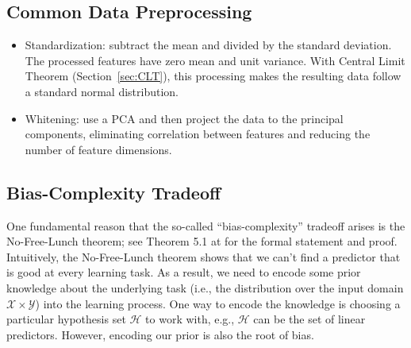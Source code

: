 \subsection{Common Data Preprocessing}
    \begin{itemize}
        \item Standardization: subtract the mean and divided by the standard deviation. The processed features have zero mean and unit variance. With Central Limit Theorem (Section~\ref{sec:CLT}), this processing makes the resulting data follow a standard normal distribution.
        \item Whitening: use a PCA and then project the data to the principal components, eliminating correlation between features and reducing the number of feature dimensions. 
    \end{itemize}
    


\subsection{Bias-Complexity Tradeoff}
One fundamental reason that the so-called ``bias-complexity'' tradeoff arises is the No-Free-Lunch theorem; see Theorem 5.1 at \cite{shalev2014understanding} for the formal statement and proof.
Intuitively, the No-Free-Lunch theorem shows that we can't find a predictor that is good at every learning task. 
As a result, we need to encode some prior knowledge about the underlying task (i.e., the distribution over the input domain $\mathcal{X} \times \mathcal{Y}$) into the learning process.
One way to encode the knowledge is choosing a particular hypothesis set $\mathcal{H}$ to work with, e.g., $\mathcal{H}$ can be the set of linear predictors.
However, encoding our prior is also the root of bias.

